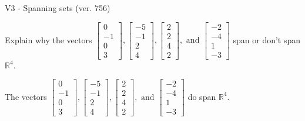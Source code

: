 \begin{exercise}
  \begin{exerciseTitle}V3 - Spanning sets (ver. 756)\end{exerciseTitle}
  \begin{exerciseStatement}
    Explain why the vectors \(\left[\begin{array}{r}
0 \\
-1 \\
0 \\
3
\end{array}\right] , \left[\begin{array}{r}
-5 \\
-1 \\
2 \\
4
\end{array}\right] , \left[\begin{array}{r}
2 \\
2 \\
4 \\
2
\end{array}\right] , \text{ and } \left[\begin{array}{r}
-2 \\
-4 \\
1 \\
-3
\end{array}\right]\) span or don't span \(\mathbb{R}^4\). 
	


  \end{exerciseStatement}
  \begin{exerciseAnswer}
   The vectors \(\left[\begin{array}{r}
0 \\
-1 \\
0 \\
3
\end{array}\right] , \left[\begin{array}{r}
-5 \\
-1 \\
2 \\
4
\end{array}\right] , \left[\begin{array}{r}
2 \\
2 \\
4 \\
2
\end{array}\right] , \text{ and } \left[\begin{array}{r}
-2 \\
-4 \\
1 \\
-3
\end{array}\right]\) 
  	 do  
	span \(\mathbb{R}^4\).
  


  \end{exerciseAnswer}
\end{exercise}